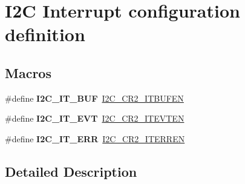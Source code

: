 \hypertarget{group___i2_c___interrupt__configuration__definition}{}\section{I2C Interrupt configuration definition}
\label{group___i2_c___interrupt__configuration__definition}
\subsection*{Macros}
\begin{DoxyCompactItemize}
\item 
\mbox{\label{group___i2_c___interrupt__configuration__definition_gad3ff3f405b882aa4d2f91310aa1cc0df}} 
\#define {\bfseries I2\+C\+\_\+\+I\+T\+\_\+\+B\+UF}~\mbox{\hyperlink{group___peripheral___registers___bits___definition_ga2efbe5d96ed0ce447a45a62e8317a68a}{I2\+C\+\_\+\+C\+R2\+\_\+\+I\+T\+B\+U\+F\+EN}}
\item 
\mbox{\label{group___i2_c___interrupt__configuration__definition_gadd59efa313e1598a084a1e5ec3905b02}} 
\#define {\bfseries I2\+C\+\_\+\+I\+T\+\_\+\+E\+VT}~\mbox{\hyperlink{group___peripheral___registers___bits___definition_ga3b1ebaf8173090ec469b055b98e585d2}{I2\+C\+\_\+\+C\+R2\+\_\+\+I\+T\+E\+V\+T\+EN}}
\item 
\mbox{\label{group___i2_c___interrupt__configuration__definition_gadba3667b439cbf4ba1e6e9aec961ab03}} 
\#define {\bfseries I2\+C\+\_\+\+I\+T\+\_\+\+E\+RR}~\mbox{\hyperlink{group___peripheral___registers___bits___definition_ga6f14ae48e4609c2b3645211234cba974}{I2\+C\+\_\+\+C\+R2\+\_\+\+I\+T\+E\+R\+R\+EN}}
\end{DoxyCompactItemize}


\subsection{Detailed Description}
